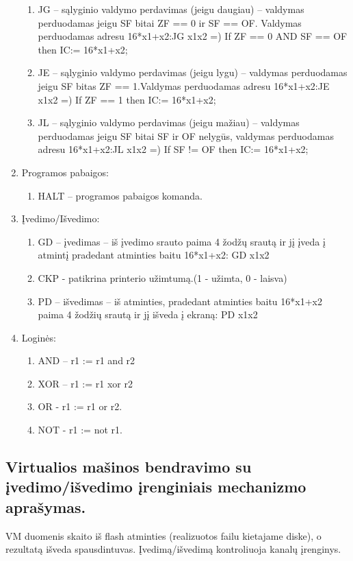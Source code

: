 \documentclass[oneside]{VUMIFPSkursinis}
\begin{document}
\begin{enumerate}
\begin{enumerate}
\item JG – sąlyginio valdymo perdavimas (jeigu daugiau) – valdymas perduodamas jeigu SF bitai ZF == 0 ir SF == OF. Valdymas perduodamas adresu 16*x1+x2:JG x1x2 =) If ZF == 0 AND SF == OF then IC:= 16*x1+x2;
\item JE – sąlyginio valdymo perdavimas (jeigu lygu) – valdymas perduodamas jeigu SF bitas ZF == 1.Valdymas perduodamas adresu 16*x1+x2:JE x1x2 =) If ZF == 1 then IC:= 16*x1+x2;
\item JL – sąlyginio valdymo perdavimas (jeigu mažiau) – valdymas perduodamas jeigu SF bitai SF ir OF nelygūs, valdymas perduodamas adresu 16*x1+x2:JL x1x2 =) If SF != OF then IC:= 16*x1+x2;
\end{enumerate}
\item Programos pabaigos:
\begin{enumerate}
\item HALT – programos pabaigos komanda.
\end{enumerate}
\item Įvedimo/Išvedimo:
\begin{enumerate}
\item GD – įvedimas – iš įvedimo srauto paima 4 žodžų srautą ir jį įveda į atmintį
pradedant atminties baitu 16*x1+x2:
GD x1x2
\item CKP - patikrina printerio užimtumą.(1 - užimta, 0 - laisva)
\item PD – išvedimas – iš atminties, pradedant atminties baitu 16*x1+x2  paima 4 žodžių
srautą ir jį išveda į ekraną:
PD x1x2
\end{enumerate}
\item Loginės:
\begin{enumerate}
\item AND – r1 := r1 and r2
\item XOR – r1 := r1 xor r2
\item OR - r1 := r1 or r2.
\item NOT - r1 := not r1.
\end{enumerate}
\end{enumerate}
\subsection{Virtualios mašinos bendravimo su įvedimo/išvedimo įrenginiais mechanizmo aprašymas.}
VM duomenis skaito iš flash atminties (realizuotos failu kietajame diske), o rezultatą išveda spausdintuvas. Įvedimą/išvedimą kontroliuoja kanalų įrenginys.
\end{document}
